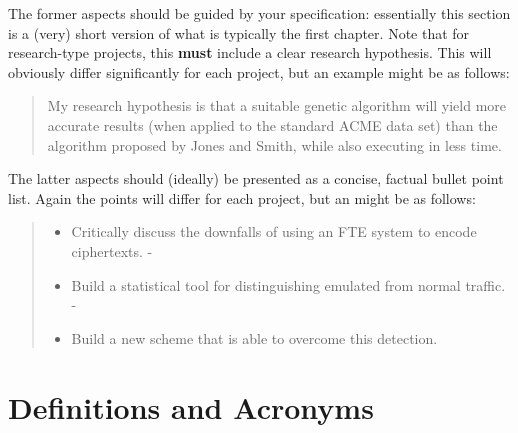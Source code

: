 \documentclass[ %
                    author={Samuel Russell},
                supervisor={Prof. Bogdan Warinschi},
                    degree={MEng},
                     title={Innocuous Ciphertexts},
                  subtitle={The DE-CENSOR Scheme},
                      type={research},
                      year={2018} ]{dissertation}
\begin{document}
The former aspects should be guided by your specification: essentially 
this section is a (very) short version of what is typically the first 
chapter.  Note that for research-type projects, this {\bf must} include 
a clear research hypothesis.  This will obviously differ significantly
for each project, but an example might be as follows:

\begin{quote}
My research hypothesis is that a suitable genetic algorithm will yield
more accurate results (when applied to the standard ACME data set) than 
the algorithm proposed by Jones and Smith, while also executing in less
time.
\end{quote}

\noindent
The latter aspects should (ideally) be presented as a concise, factual 
bullet point list.  Again the points will differ for each project, but 
an might be as follows:

\begin{quote}
\noindent
\begin{itemize}
\item Critically discuss the downfalls of using an FTE system to encode ciphertexts.
-\item Build a statistical tool for distinguishing emulated from normal traffic.
-\item Build a new scheme that is able to overcome this detection.
\end{itemize}
\end{quote}


\chapter*{Definitions and Acronyms}

\vspace{1cm} 
\end{document}
